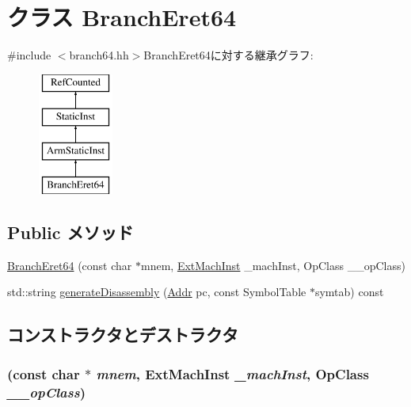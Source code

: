 \hypertarget{classArmISA_1_1BranchEret64}{
\section{クラス BranchEret64}
\label{classArmISA_1_1BranchEret64}
}


{\ttfamily \#include $<$branch64.hh$>$}BranchEret64に対する継承グラフ:\begin{figure}[H]
\begin{center}
\leavevmode
\includegraphics[height=4cm]{classArmISA_1_1BranchEret64}
\end{center}
\end{figure}
\subsection*{Public メソッド}
\begin{DoxyCompactItemize}
\item 
\hyperlink{classArmISA_1_1BranchEret64_a79636504bf9a3839887097c36a261bb1}{BranchEret64} (const char $\ast$mnem, \hyperlink{classStaticInst_a5605d4fc727eae9e595325c90c0ec108}{ExtMachInst} \_\-machInst, OpClass \_\-\_\-opClass)
\item 
std::string \hyperlink{classArmISA_1_1BranchEret64_a95d323a22a5f07e14d6b4c9385a91896}{generateDisassembly} (\hyperlink{classm5_1_1params_1_1Addr}{Addr} pc, const SymbolTable $\ast$symtab) const 
\end{DoxyCompactItemize}


\subsection{コンストラクタとデストラクタ}
\hypertarget{classArmISA_1_1BranchEret64_a79636504bf9a3839887097c36a261bb1}{
\subsubsection[{BranchEret64}]{ (const char $\ast$ {\em mnem}, \/  {\bf ExtMachInst} {\em \_\-machInst}, \/  OpClass {\em \_\-\_\-opClass})}}
\label{classArmISA_1_1BranchEret64_a79636504bf9a3839887097c36a261bb1}



